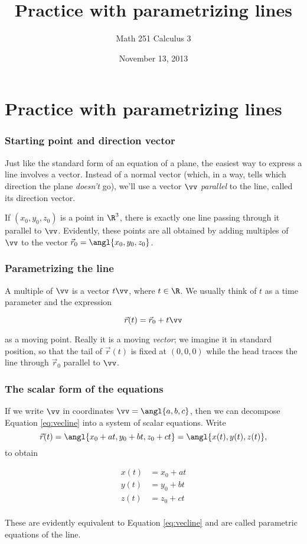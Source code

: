 \documentclass[11pt,ignorenonframetext,]{beamer}
\title{Practice with parametrizing lines}
\author{Math 251 Calculus 3}
\date{November 13, 2013}
\begin{document}
\frame{\titlepage}

\section{Practice with parametrizing lines}

\begin{frame}\frametitle{Starting point and direction vector}

Just like the standard form of an equation of a plane, the easiest way
to express a line involves a vector. Instead of a normal vector (which,
in a way, tells which direction the plane \emph{doesn't} go), we'll use
a vector $\vv$ \emph{parallel} to the line, called its direction vector.

If $(x_0, y_0, z_0)$ is a point in $\R^3$, there is exactly one line
passing through it parallel to $\vv$. Evidently, these points are all
obtained by adding multiples of $\vv$ to the vector
$\vec{r}_0 = \angl{x_0, y_0, z_0}$.

\end{frame}

\begin{frame}\frametitle{Parametrizing the line}

A multiple of $\vv$ is a vector $t \vv$, where $t \in \R$. We usually
think of $t$ as a time parameter and the expression

\begin{equation} \label{eq:vecline}
\vec{r}(t) = \vec{r}_0 + t \vv 
\end{equation}

as a moving point. Really it is a moving \emph{vector}; we imagine it in
standard position, so that the tail of $\vec{r}(t)$ is fixed at
$(0,0,0)$ while the head traces the line through $\vec{r}_0$ parallel to
$\vv$.

\end{frame}

\begin{frame}\frametitle{The scalar form of the equations}

If we write $\vv$ in coordinates $\vv = \angl{a,b,c}$, then we can
decompose Equation \ref{eq:vecline} into a system of scalar equations.
Write
\[\vec{r}(t) = \angl{x_0 + at, y_0 + bt, z_0 + ct} = \angl{x(t), y(t), z(t)},\]
to obtain

\begin{align*}
    x(t) &= x_0 + at \\
    y(t) &= y_0 + bt \\
    z(t) &= z_0 + ct \\
\end{align*}

These are evidently equivalent to Equation \ref{eq:vecline} and are
called parametric equations of the line.

\end{frame}
\end{document}
